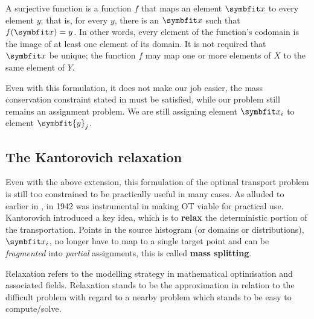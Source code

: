 \begin{tcolorbox}[title=Surjective functions]
A surjective function is a function $f$ that maps an element $\bfitx$ to every element $y$; that is, for every $y$, there is an $\bfitx$ such that $f(\bfitx) = y$. In other words, every element of the function's codomain is the image of at least one element of its domain. It is not required that $\bfitx$ be unique; the function $f$ may map one or more elements of $X$ to the same element of $Y$. 
\end{tcolorbox}

Even with this formulation, it does not make our job easier, the mass conservation constraint stated in  must be satisfied, while our problem still remains an assignment problem. We are still assigning element $\bfitx_i$ to element $\symbfit{y}_j$.

\subsection{The Kantorovich relaxation}\label{ssec:ot-kantorovich-relax}

Even with the above extension, this formulation of the optimal transport problem is still too constrained to be practically useful in many cases. As alluded to earlier in , in 1942 \citeauthor{Kantorovich42} was instrumental in making OT viable for practical use. Kantorovich introduced a key idea, which is to \textbf{relax} the deterministic portion of the transportation. Points in the source histogram (or domains or distributions), $\bfitx_i$, no longer have to map to a single target point and can be \textit{fragmented} into \textit{partial} assignments, this is called \textbf{mass splitting}.

\begin{tcolorbox}[title=Relaxation]
Relaxation refers to the modelling strategy in mathematical optimisation and associated fields. Relaxation stands to be the approximation in relation to the difficult problem with regard to a nearby problem which stands to be easy to compute/solve.
\end{tcolorbox}

